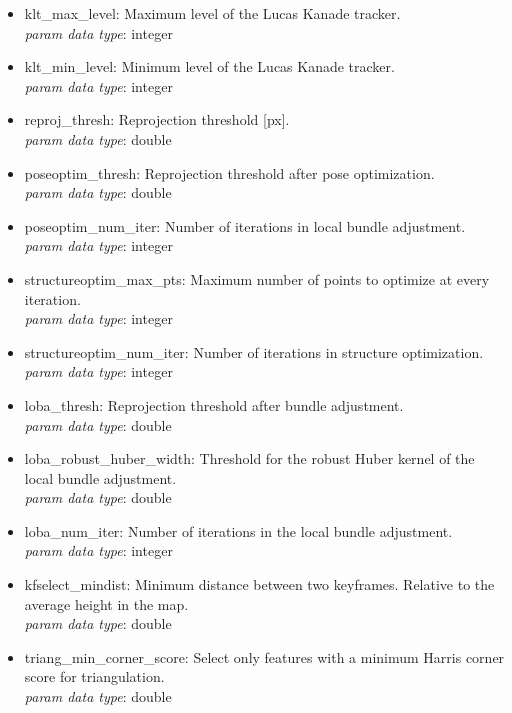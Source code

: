 \begin{itemize}
\begin{itemize}
\item klt\_max\_level: Maximum level of the Lucas Kanade tracker.	 \\
\textit{param data type}: integer

\item klt\_min\_level: Minimum level of the Lucas Kanade tracker.	 \\
\textit{param data type}: integer

\item reproj\_thresh: Reprojection threshold [px].	 \\
\textit{param data type}: double

\item poseoptim\_thresh:	Reprojection threshold after pose optimization. \\
\textit{param data type}: double

\item poseoptim\_num\_iter:	Number of iterations in local bundle adjustment. \\
\textit{param data type}: integer

\item structureoptim\_max\_pts: Maximum number of points to optimize at every iteration.	 \\
\textit{param data type}: integer

\item structureoptim\_num\_iter:	Number of iterations in structure optimization. \\
\textit{param data type}: integer

\item loba\_thresh: Reprojection threshold after bundle adjustment.	 \\
\textit{param data type}: double

\item loba\_robust\_huber\_width: Threshold for the robust Huber kernel of the local bundle adjustment.	 \\
\textit{param data type}: double

\item loba\_num\_iter: Number of iterations in the local bundle adjustment.	 \\
\textit{param data type}: integer

\item kfselect\_mindist:	Minimum distance between two keyframes. Relative to the average height in the map. \\
\textit{param data type}: double

\item triang\_min\_corner\_score: Select only features with a minimum Harris corner score for triangulation.	 \\
\textit{param data type}: double


\end{itemize}
\end{itemize}
